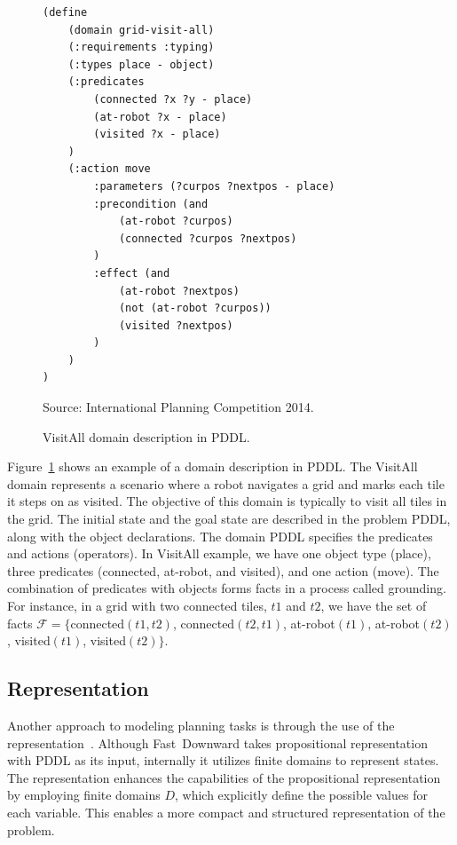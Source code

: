 \begin{figure}[ht]
\caption{VisitAll domain description in PDDL.}
\label{fig:pddl}
\addvspace{\baselineskip}
\centering
\begin{lstlisting}[basicstyle=\ttfamily]
(define
    (domain grid-visit-all)
    (:requirements :typing)
    (:types place - object)
    (:predicates
        (connected ?x ?y - place)
        (at-robot ?x - place)
        (visited ?x - place)
    )
    (:action move
        :parameters (?curpos ?nextpos - place)
        :precondition (and
            (at-robot ?curpos)
            (connected ?curpos ?nextpos)
        )
        :effect (and 
            (at-robot ?nextpos)
            (not (at-robot ?curpos))
            (visited ?nextpos)
        )
    )
)
\end{lstlisting}
Source: International Planning Competition 2014.
\end{figure}

Figure~\ref{fig:pddl} shows an example of a domain description in PDDL. The VisitAll domain represents a scenario where a robot navigates a grid and marks each tile it steps on as visited. The objective of this domain is typically to visit all tiles in the grid. The initial state and the goal state are described in the problem PDDL, along with the object declarations. The domain PDDL specifies the predicates and actions (operators). In VisitAll example, we have one object type (place), three predicates (connected, at-robot, and visited), and one action (move). The combination of predicates with objects forms facts in a process called grounding. For instance, in a grid with two connected tiles, $t1$ and $t2$, we have the set of facts $\mathcal{F}=\{$connected$(t1,t2)$, connected$(t2,t1)$, at-robot$(t1)$, at-robot$(t2)$, visited$(t1)$, visited$(t2)\}$.

\subsection{\sas Representation}
\label{sec:background_sas}

Another approach to modeling planning tasks is through the use of the \sas representation~\cite{Backstrom.Nebel/1995}. Although Fast~Downward takes propositional representation with PDDL as its input, internally it utilizes finite domains to represent states. The \sas representation enhances the capabilities of the propositional representation by employing finite domains $D$, which explicitly define the possible values for each variable. This enables a more compact and structured representation of the problem.


